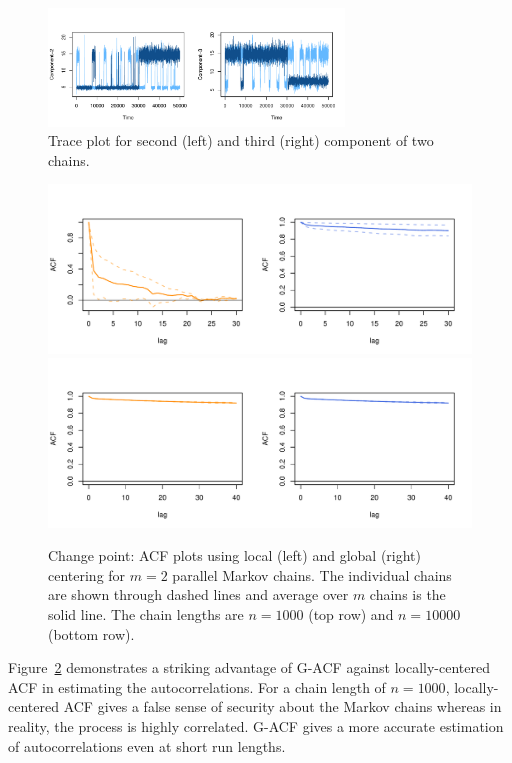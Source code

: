\documentclass[12pt]{article}
\theoremstyle{remark}
\begin{document}
\begin{figure}[htbp]
    \centering
    \includegraphics[width = 0.7\textwidth]{plots/poisson-trace_n50000.pdf}
    \caption{Trace plot for second (left) and third (right) component of two chains.}
    \label{fig:poisson-trace}
\end{figure}
\begin{figure}[htbp]
    \centering
      \includegraphics[width = .6\textwidth]{plots/poisson-acf_n1000.pdf}  \\ \vspace{-.5cm}
      \includegraphics[width = .6\textwidth]{plots/poisson-acf_n10000.pdf}      
    \caption{Change point: ACF plots using local (left) and global (right) centering for $m=2$ parallel Markov chains. The individual chains are shown through dashed lines and average over $m$ chains is the solid line. The chain lengths are $n = 1000$ (top row) and $n = 10000$ (bottom row).}
    \label{fig:poisson-acf}
\end{figure}

Figure~\ref{fig:poisson-acf} demonstrates a striking advantage of G-ACF against locally-centered ACF in estimating the autocorrelations. For a chain length of $n=1000$, locally-centered ACF gives a false sense of security about the Markov chains whereas in reality, the process is highly correlated. G-ACF gives a more accurate estimation of autocorrelations even at short run lengths.

\end{document}
